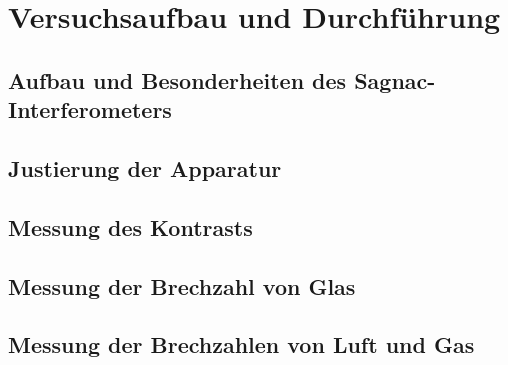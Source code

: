 
\section{Versuchsaufbau und Durchführung}

\subsection{Aufbau und Besonderheiten des Sagnac-Interferometers}

\subsection{Justierung der Apparatur}

\subsection{Messung des Kontrasts}

\subsection{Messung der Brechzahl von Glas}

\subsection{Messung der Brechzahlen von Luft und Gas}
